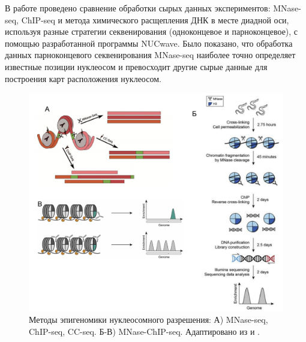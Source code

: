     В работе \cite{quintales_comparative_2015} проведено сравнение обработки сырых данных экспериментов: MNase-seq, ChIP-seq и метода химического расщепления ДНК в месте диадной оси, используя разные стратегии секвенирования (одноконцевое и парноконцевое), с помощью разработанной программы NUCwave. Было показано, что обработка данных парноконцевого секвенирования MNase-seq наиболее точно определяет известные позиции нуклеосом и превосходит другие сырые данные для построения карт расположения нуклеосом.

\begin{figure} [h!]
    \centering
    \includegraphics [width=\textwidth]{images/p1/part1_5_genome/p1_5_genome_f6.pdf}
    \caption[Методы эпигеномики нуклеосомного разрешения]{Методы эпигеномики нуклеосомного разрешения: А) MNase-seq, ChIP-seq, CC-seq. Б-В) MNase-ChIP-seq. Адаптировано из \cite{quintales_comparative_2015} и \cite{wedel_genome-wide_2017}.}
    \label{fig:p1_5_genome:f6}
\end{figure}

















